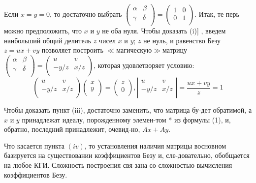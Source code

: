 \documentclass{mai_book}
\begin{document}
\begin{myproof}
  Если $x=y=0$, то достаточно выбрать ${\left( \begin{array}{ccc}
\alpha & \beta \\
\gamma & \delta \\
\end{array} \right)}={\left( \begin{array}{ccc}
1 & 0 \\
0 & 1 \\
\end{array} \right)}$. Итак, те-\linebreak перь можно предположить, что $x$ и $y$ не оба нуля. Чтобы доказать \linebreak (i)] , введем наибольший общий делитель $z$ чисел $x$ и $y$; $z$ не нуль, \linebreak  и равенство Безу $z=ux+vy$ позволяет построить $\ll$магическую$\gg$\linebreak матрицу ${\left( \begin{array}{ccc}
\alpha & \beta \\
\gamma & \delta \\
\end{array} \right)}={\left( \begin{array}{ccc}
u & v \\
-y/z & x/z \\
\end{array} \right)}$, которая удовлетворяет условию:
$${\left( \begin{array}{ccc}
u & v \\
-y/z & x/z \\
\end{array} \right)}{\left( \begin{array}{ccc}
x \\
y \\
\end{array} \right)}={\left( \begin{array}{ccc}
z \\
0 \\
\end{array} \right)}, {\left| \begin{array}{ccc}
u & v \\
-y/z & x/z \\
\end{array} \right|} = \frac{ux+vy}{z}=1$$
  
  Чтобы доказать пункт (iii), достаточно заменить, что матрица бу-\linebreak дет обратимой, а $x$ и $y$ принадлежат идеалу, порожденному элемен-\linebreak том * из формулы (1), и, обратно, последний принадлежит, очевид-\linebreak но, $Ax+Ay$.
 

\noindent Что касается пункта $(iv)$, то установления наличия матрицы в\linebreak основном базируется на существовании коэффициентов Безу и, сле-\linebreak довательно, обобщается на любое КГИ. Сложность построения свя-\linebreak зана со сложностью вычисления коэффициентов Безу.
\end{myproof}
\end{document}
